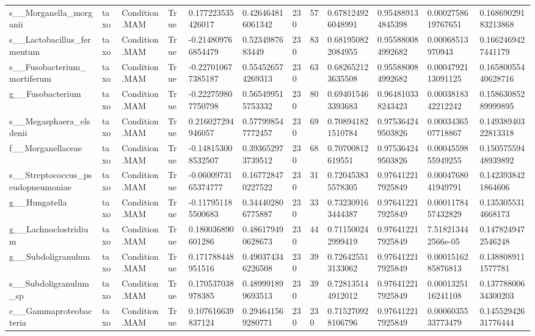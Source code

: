 \begin{longtable}{llllllllllll}
s\_\_Morganella\_morganii & taxo & Condition.MAM & True & 0.177223535426017 & 0.426464816061342 & 230 & 57 & 0.678124926048991 & 0.954889134845398 & 0.0002758619767651 & 0.16869029183213868 \\
s\_\_Lactobacillus\_fermentum & taxo & Condition.MAM & True & -0.214809766854479 & 0.5234987683449 & 230 & 83 & 0.681950822084955 & 0.955880084992682 & 0.00068513970943 & 0.1662469427441179 \\
s\_\_Fusobacterium\_mortiferum & taxo & Condition.MAM & True & -0.227010677385187 & 0.554526574269313 & 230 & 63 & 0.682652123635508 & 0.955880084992682 & 0.0004792113091125 & 0.16580055440628716 \\
g\_\_Fusobacterium & taxo & Condition.MAM & True & -0.222759807750798 & 0.565499515753332 & 230 & 80 & 0.694015463393683 & 0.964810338243423 & 0.0003818342212242 & 0.15863085289999895 \\
s\_\_Megasphaera\_elsdenii & taxo & Condition.MAM & True & 0.216027294946057 & 0.577998547772457 & 230 & 69 & 0.708941821510784 & 0.975364249503826 & 0.0003436507718867 & 0.14938940322813318 \\
f\_\_Morganellaceae & taxo & Condition.MAM & True & -0.148153008532507 & 0.393652973739512 & 230 & 68 & 0.70700812619551 & 0.975364249503826 & 0.0004559855949255 & 0.15057559448939892 \\
s\_\_Streptococcus\_pseudopneumoniae & taxo & Condition.MAM & True & -0.0600973165374777 & 0.167728470227522 & 230 & 31 & 0.720453835578305 & 0.976412217925849 & 0.0004768041949791 & 0.1423938421864606 \\
g\_\_Hungatella & taxo & Condition.MAM & True & -0.117951185500683 & 0.344402806775887 & 230 & 33 & 0.732309163444387 & 0.976412217925849 & 0.0001178457432829 & 0.1353055314668173 \\
g\_\_Lachnoclostridium & taxo & Condition.MAM & True & 0.180036890601286 & 0.486179490628673 & 230 & 44 & 0.711500242999419 & 0.976412217925849 & 7.518213442566e-05 & 0.1478249472546248 \\
g\_\_Subdoligranulum & taxo & Condition.MAM & True & 0.171788448951516 & 0.490374346226508 & 230 & 39 & 0.726425513133062 & 0.976412217925849 & 0.0001516285876813 & 0.1388089111577781 \\
s\_\_Subdoligranulum\_sp & taxo & Condition.MAM & True & 0.170537038978385 & 0.489991899693513 & 230 & 39 & 0.728135144912012 & 0.976412217925849 & 0.0001325116241108 & 0.13778800634300203 \\
c\_\_Gammaproteobacteria & taxo & Condition.MAM & True & 0.107616639837124 & 0.294641569280771 & 230 & 230 & 0.715270928106796 & 0.976412217925849 & 0.0006035533773479 & 0.14552942631776444 \\

\end{longtable}
